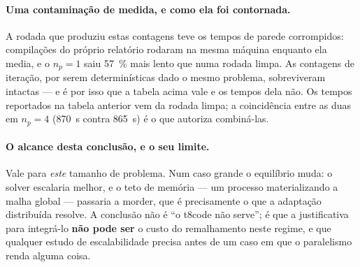 \paragraph{Uma contamina\c{c}\~ao de medida, e como ela foi contornada.} A rodada
que produziu estas contagens teve os tempos de parede corrompidos: compila\c{c}\~oes
do pr\'oprio relat\'orio rodaram na mesma m\'aquina enquanto ela media, e o
$n_p=1$ saiu \SI{57}{\percent} mais lento que numa rodada limpa. As contagens de
itera\c{c}\~ao, por serem determin\'isticas dado o mesmo problema, sobreviveram
intactas --- e \'e por isso que a tabela acima vale e os tempos dela n\~ao. Os
tempos reportados na tabela anterior vem da rodada limpa; a coincid\^encia entre
as duas em $n_p=4$ (\SI{870}{\second} contra \SI{865}{\second}) \'e o que autoriza
combin\'a-las.

\paragraph{O alcance desta conclus\~ao, e o seu limite.} Vale para \emph{este}
tamanho de problema. Num caso grande o equil\'ibrio muda: o solver escalaria
melhor, e o teto de mem\'oria --- um processo materializando a malha global ---
passaria a morder, que \'e precisamente o que a adapta\c{c}\~ao distribu\'ida
resolve. A conclus\~ao n\~ao \'e ``o t8code n\~ao serve''; \'e que a
justificativa para integr\'a-lo \textbf{n\~ao pode ser} o custo do remalhamento
neste regime, e que qualquer estudo de escalabilidade precisa antes de um caso em
que o paralelismo renda alguma coisa.
